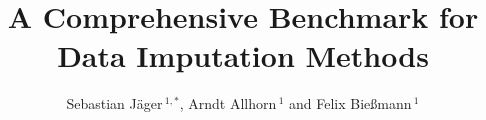 \documentclass[utf8]{frontiersSCNS} %
\def\firstAuthorLast{Jäger {et~al.}} %
\def\Authors{Sebastian Jäger\,$^{1,*}$, Arndt Allhorn\,$^{1}$ and Felix Bießmann\,$^{1}$}
\begin{document}
\onecolumn
{}

\title[A Comprehensive Benchmark for Data Imputation Methods]{A Comprehensive Benchmark for Data Imputation Methods}

\author[\firstAuthorLast ]{\Authors} %
\address{} %
\correspondance{} %

\extraAuth{}%


\maketitle

















\end{document}
